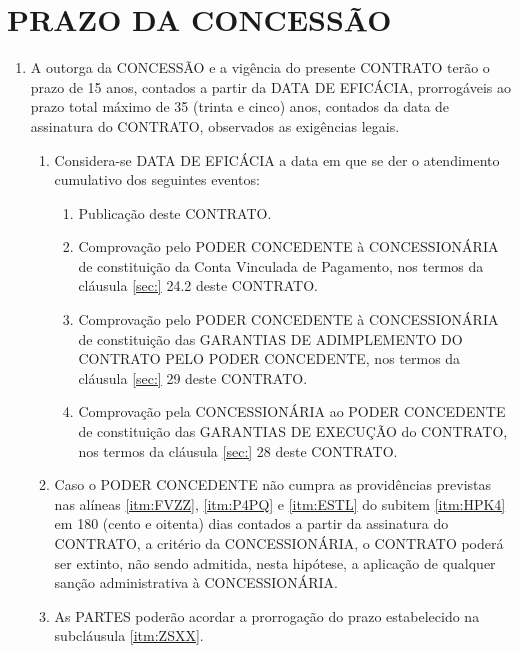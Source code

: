 \documentclass[a4paper,11pt]{report} %
\begin{document}
\section{PRAZO DA CONCESSÃO}
\label{sec:HWPQ}
\begin{enumerate}
\item \label{itm:8UN6} A outorga da CONCESSÃO e a vigência do presente CONTRATO terão o prazo de 15 anos, contados a partir da DATA DE EFICÁCIA, prorrogáveis ao prazo total máximo de 35 (trinta e cinco) anos, contados da data de assinatura do CONTRATO, observados as exigências legais.

\begin{enumerate}[label*=\arabic*.]
\item \label{itm:HPK4} Considera-se DATA DE EFICÁCIA a data em que se der o atendimento cumulativo dos seguintes eventos: 

\begin{enumerate}[label*=\arabic*.]
\item \label{itm:FVZZ} Publicação deste CONTRATO.
\item \label{itm:P4PQ} Comprovação pelo PODER CONCEDENTE à CONCESSIONÁRIA de constituição da Conta Vinculada de Pagamento, nos termos da cláusula \ref{sec:} 24.2 deste CONTRATO.
\item \label{itm:ESTL} Comprovação pelo PODER CONCEDENTE à CONCESSIONÁRIA de constituição das GARANTIAS DE ADIMPLEMENTO DO CONTRATO PELO PODER CONCEDENTE, nos termos da cláusula \ref{sec:} 29 deste CONTRATO.
\item \label{itm:6Z8J} Comprovação pela CONCESSIONÁRIA ao PODER CONCEDENTE de constituição das GARANTIAS DE EXECUÇÃO do CONTRATO, nos termos da cláusula \ref{sec:} 28 deste CONTRATO.
\end{enumerate}

\item \label{itm:ZSXX} Caso o PODER CONCEDENTE não cumpra as providências previstas nas alíneas \ref{itm:FVZZ}, \ref{itm:P4PQ} e \ref{itm:ESTL} do subitem \ref{itm:HPK4} em 180 (cento e oitenta) dias contados a partir da assinatura do CONTRATO, a critério da CONCESSIONÁRIA, o CONTRATO poderá ser extinto, não sendo admitida, nesta hipótese, a aplicação de qualquer sanção administrativa à CONCESSIONÁRIA.
\item \label{itm:7CSU} As PARTES poderão acordar a prorrogação do prazo estabelecido na subcláusula \ref{itm:ZSXX}.

\end{enumerate}
\end{enumerate}
\end{document}
